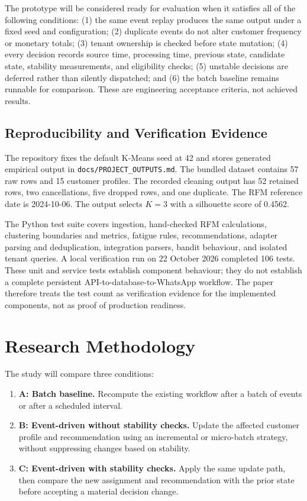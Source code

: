\documentclass[conference]{IEEEtran}
\begin{document}
The prototype will be considered ready for evaluation when it satisfies all of the following conditions: (1) the same event replay produces the same output under a fixed seed and configuration; (2) duplicate events do not alter customer frequency or monetary totals; (3) tenant ownership is checked before state mutation; (4) every decision records source time, processing time, previous state, candidate state, stability measurements, and eligibility checks; (5) unstable decisions are deferred rather than silently dispatched; and (6) the batch baseline remains runnable for comparison. These are engineering acceptance criteria, not achieved results.

\subsection{Reproducibility and Verification Evidence}
The repository fixes the default K-Means seed at 42 and stores generated empirical output in \texttt{docs/PROJECT\_OUTPUTS.md}. The bundled dataset contains 57 raw rows and 15 customer profiles. The recorded cleaning output has 52 retained rows, two cancellations, five dropped rows, and one duplicate. The RFM reference date is 2024-10-06. The output selects $K=3$ with a silhouette score of 0.4562.

The Python test suite covers ingestion, hand-checked RFM calculations, clustering boundaries and metrics, fatigue rules, recommendations, adapter parsing and deduplication, integration parsers, bandit behaviour, and isolated tenant queries. A local verification run on 22 October 2026 completed 106 tests. These unit and service tests establish component behaviour; they do not establish a complete persistent API-to-database-to-WhatsApp workflow. The paper therefore treats the test count as verification evidence for the implemented components, not as proof of production readiness.

\section{Research Methodology}
The study will compare three conditions:
\begin{enumerate}
    \item \textbf{A: Batch baseline.} Recompute the existing workflow after a batch of events or after a scheduled interval.
    \item \textbf{B: Event-driven without stability checks.} Update the affected customer profile and recommendation using an incremental or micro-batch strategy, without suppressing changes based on stability.
    \item \textbf{C: Event-driven with stability checks.} Apply the same update path, then compare the new assignment and recommendation with the prior state before accepting a material decision change.
\end{enumerate}
\end{document}
